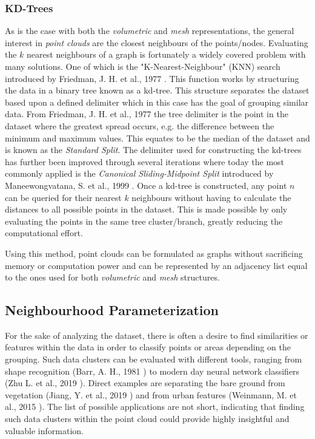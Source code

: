\documentclass[%
]{USN-MSc}
\begin{document}
\subsubsection{KD-Trees}
\label{subsub:KD-Trees}
As is the case with both the \textit{volumetric} and \textit{mesh} representations, the general interest in \textit{point clouds} are the closest neighbours of the points/nodes. Evaluating the \(k\) nearest neighbours of a graph is fortunately a widely covered problem with many solutions. One of which is the "K-Nearest-Neighbour" (KNN) search introduced by Friedman, J. H. et al., 1977 \cite{kd-tree}. This function works by structuring the data in a binary tree known as a kd-tree. This structure separates the dataset based upon a defined delimiter which in this case has the goal of grouping similar data. From Friedman, J. H. et al., 1977 \cite{kd-tree} the tree delimiter is the point in the dataset where the greatest spread occurs, e.g. the difference between the minimum and maximum values. This equates to be the median of the dataset and is known as the \textit{Standard Split}. The delimiter used for constructing the kd-trees has further been improved through several iterations where today the most commonly applied is the \textit{Canonical Sliding-Midpoint Split} introduced by Maneewongvatana, S. et al., 1999 \cite{kd-tree-sliding-midpoint}. Once a kd-tree is constructed, any point \(n\) can be queried for their nearest \(k\) neighbours without having to calculate the distances to all possible points in the dataset. This is made possible by only evaluating the points in the same tree cluster/branch, greatly reducing the computational effort.

Using this method, point clouds can be formulated as graphs without sacrificing memory or computation power and can be represented by an adjacency list equal to the ones used for both \textit{volumetric} and \textit{mesh} structures.

\subsection{Neighbourhood Parameterization}
\label{sub:Neighbourhood Parameterization}
For the sake of analyzing the dataset, there is often a desire to find similarities or features within the data in order to classify points or areas depending on the grouping. Such data clusters can be evaluated with different tools, ranging from shape recognition (Barr, A. H., 1981 \cite{Superquadrics}) to modern day neural network classifiers (Zhu L. et al., 2019 \cite{nn-point-cloud-classifier}).
Direct examples are separating the bare ground from vegetation (Jiang, Y. et al., 2019 \cite{nn-crops}) and from urban features (Weinmann, M. et al., 2015 \cite{optimalNeighbourhood}). The list of possible applications are not short, indicating that finding such data clusters within the point cloud could provide highly insightful and valuable information. 
\end{document}
